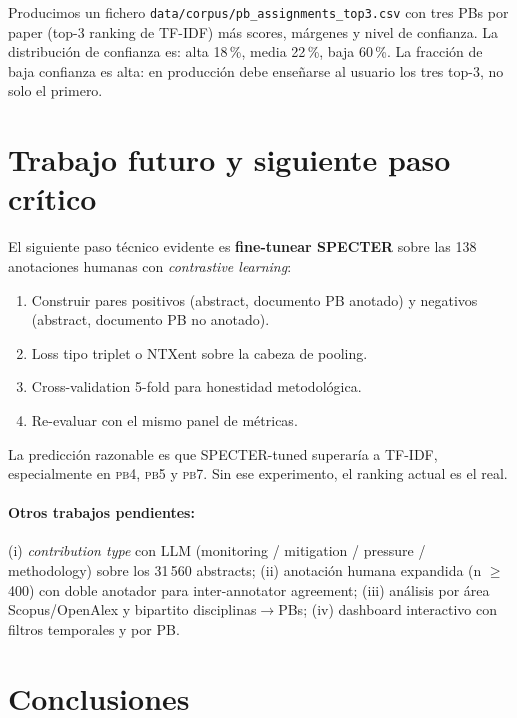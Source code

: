 \documentclass[11pt,a4paper]{article}
\newcommand{\pb}[1]{\textsc{pb#1}}
\begin{document}
Producimos un fichero \texttt{data/corpus/pb\_assignments\_top3.csv} con tres PBs por paper (top-3 ranking de TF-IDF) más scores, márgenes y nivel de confianza. La distribución de confianza es: alta 18\,\%, media 22\,\%, baja 60\,\%. La fracción de baja confianza es alta: en producción debe enseñarse al usuario los tres top-3, no solo el primero.

\section{Trabajo futuro y siguiente paso crítico}

El siguiente paso técnico evidente es \textbf{fine-tunear SPECTER} sobre las 138 anotaciones humanas con \emph{contrastive learning}:

\begin{enumerate}
\item Construir pares positivos (abstract, documento PB anotado) y negativos (abstract, documento PB no anotado).
\item Loss tipo triplet o NTXent sobre la cabeza de pooling.
\item Cross-validation 5-fold para honestidad metodológica.
\item Re-evaluar con el mismo panel de métricas.
\end{enumerate}

La predicción razonable es que SPECTER-tuned superaría a TF-IDF, especialmente en \pb4, \pb5 y \pb7. Sin ese experimento, el ranking actual es el real.

\paragraph{Otros trabajos pendientes:} (i) \emph{contribution type} con LLM (monitoring / mitigation / pressure / methodology) sobre los 31\,560 abstracts; (ii) anotación humana expandida (n $\geq$ 400) con doble anotador para inter-annotator agreement; (iii) análisis por área Scopus/OpenAlex y bipartito disciplinas$\to$PBs; (iv) dashboard interactivo con filtros temporales y por PB.

\section{Conclusiones}
\end{document}
